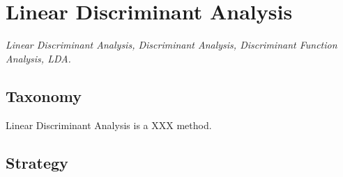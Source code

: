 
\section{Linear Discriminant Analysis} 
\label{sec:lda}

\emph{Linear Discriminant Analysis, Discriminant Analysis, Discriminant Function Analysis, LDA.}

\subsection{Taxonomy}
Linear Discriminant Analysis is a XXX method.

\subsection{Strategy}


